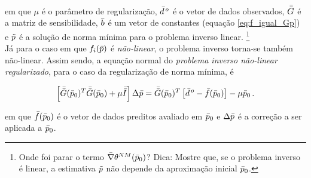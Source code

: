 \noindent em que $\mu$ é o parâmetro de regularização, $\bar{d}^{\thinspace o}$
é o vetor de dados observados, $\bar{\bar{G}}$ é a matriz de sensibilidade, $\bar{b}$
é um vetor de constantes (equação \ref{eq:f_igual_Gp}) e $\tilde{p}$ é a solução
de norma mínima para o problema inverso linear.
\footnote{
Onde foi parar o termo $\bar{\nabla}\theta^{NM}(\bar{p}_0)$? Dica: Mostre que, se o
problema inverso é linear, a estimativa $\tilde{p}$ não depende da aproximação
inicial $\bar{p}_0$.}
\\
\indent Já para o caso em que $f_i(\bar{p})$ é {\it não-linear}, o problema
inverso torna-se também não-linear. Assim sendo, a equação normal do
{\it problema inverso não-linear regularizado}, para o caso da regularização de
norma mínima, é

\begin{equation}
\left[\bar{\bar{G}}(\bar{p}_0)^T\bar{\bar{G}}(\bar{p}_0) +
      \mu\bar{\bar{I}}\right]\Delta\bar{p} =
\bar{\bar{G}}(\bar{p}_0)^T \left[\bar{d}^{\thinspace o} - \bar{f}(\bar{p}_0)\right] -
\mu\bar{p}_0
    \thinspace .
\label{eq:sistema_normal_norma_min_naolinear}
\end{equation}

\noindent em que $\bar{f}(\bar{p}_0)$ é o vetor de dados preditos avaliado em
$\bar{p}_0$ e $\Delta\bar{p}$ é a correção a ser aplicada a $\bar{p}_0$.
